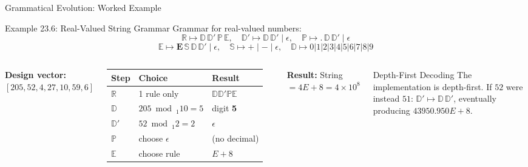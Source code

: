 \documentclass[aspectratio=169,10pt]{beamer}
\begin{document}
\begin{frame}{Grammatical Evolution: Worked Example}
  \begin{exampleblock}{Example 23.6: Real-Valued String Grammar}
    Grammar for real-valued numbers:
    \[
      \mathbb{R} \mapsto \mathbb{D}\,\mathbb{D}'\,\mathbb{P}\,\mathbb{E}, \quad
      \mathbb{D}' \mapsto \mathbb{D}\,\mathbb{D}' \mid \epsilon, \quad
      \mathbb{P} \mapsto .\,\mathbb{D}\,\mathbb{D}' \mid \epsilon
    \]
    \[
      \mathbb{E} \mapsto \mathbf{E}\,\mathbb{S}\,\mathbb{D}\,\mathbb{D}' \mid \epsilon, \quad
      \mathbb{S} \mapsto + \mid - \mid \epsilon, \quad
      \mathbb{D} \mapsto 0|1|2|3|4|5|6|7|8|9
    \]
  \end{exampleblock}

  \begin{columns}[T]
    \textbf{Design vector:} $[205, 52, 4, 27, 10, 59, 6]$
    \medskip
    \begin{tabular}{lll}
      \toprule
      Step & Choice & Result \\
      \midrule
      $\mathbb{R}$ & 1 rule only & $\mathbb{D}\mathbb{D}'\mathbb{P}\mathbb{E}$ \\
      $\mathbb{D}$ & $205 \bmod_1 10 = 5$ & digit \textbf{5} \\
      $\mathbb{D}'$ & $52 \bmod_1 2 = 2$ & $\epsilon$ \\
      $\mathbb{P}$ & choose $\epsilon$ & (no decimal) \\
      $\mathbb{E}$ & choose rule & $E+8$ \\
      \bottomrule
    \end{tabular}
    \textbf{Result:} String $= 4E{+}8 = 4\times10^8$
    \medskip
    \begin{alertblock}{Depth-First Decoding}
      The implementation is depth-first. If $52$ were instead $51$:
      $\mathbb{D}' \mapsto \mathbb{D}\,\mathbb{D}'$, eventually
      producing $43950.950E{+}8$.
    \end{alertblock}
  \end{columns}
\end{frame}
\end{document}
